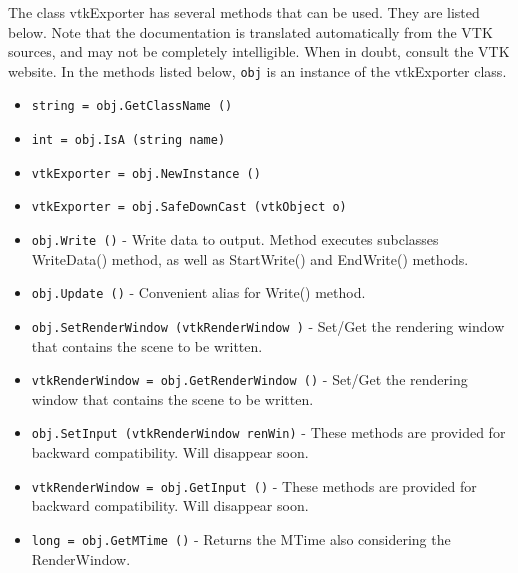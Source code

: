 The class vtkExporter has several methods that can be used.
  They are listed below.
Note that the documentation is translated automatically from the VTK sources,
and may not be completely intelligible.  When in doubt, consult the VTK website.
In the methods listed below, \verb|obj| is an instance of the vtkExporter class.
\begin{itemize}
\item  \verb|string = obj.GetClassName ()|

\item  \verb|int = obj.IsA (string name)|

\item  \verb|vtkExporter = obj.NewInstance ()|

\item  \verb|vtkExporter = obj.SafeDownCast (vtkObject o)|

\item  \verb|obj.Write ()| -  Write data to output. Method executes subclasses WriteData() method, as 
 well as StartWrite() and EndWrite() methods.

\item  \verb|obj.Update ()| -  Convenient alias for Write() method.

\item  \verb|obj.SetRenderWindow (vtkRenderWindow )| -  Set/Get the rendering window that contains the scene to be written.

\item  \verb|vtkRenderWindow = obj.GetRenderWindow ()| -  Set/Get the rendering window that contains the scene to be written.

\item  \verb|obj.SetInput (vtkRenderWindow renWin)| -  These methods are provided for backward compatibility. Will disappear
 soon.

\item  \verb|vtkRenderWindow = obj.GetInput ()| -  These methods are provided for backward compatibility. Will disappear
 soon.

\item  \verb|long = obj.GetMTime ()| -  Returns the MTime also considering the RenderWindow.

\end{itemize}
